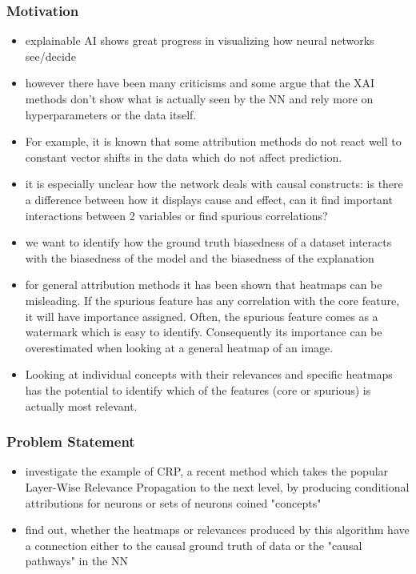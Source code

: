 \subsubsection*{Motivation}
\begin{itemize}
    \item explainable AI shows great progress in visualizing how neural networks see/decide
    \item however there have been many criticisms and some argue that the XAI methods don't show what is actually seen by the NN and rely more on hyperparameters or the data itself.
    \item For example, it is known that some attribution methods do not react well to constant vector shifts in the data which do not affect prediction.
    \item it is especially unclear how the network deals with causal constructs: is there a difference between how it displays cause and effect, can it find important interactions between 2 variables or find spurious correlations?
    \item we want to identify how the ground truth biasedness of a dataset interacts with the biasedness of the model and the biasedness of the explanation
    \item for general attribution methods it has been shown that heatmaps can be misleading. If the spurious feature has any correlation with the core feature, it will have importance assigned. Often, the spurious feature comes as a watermark which is easy to identify. Consequently its importance can be overestimated when looking at a general heatmap of an image.
    \item Looking at individual concepts with their relevances and specific heatmaps has the potential to identify which of the features (core or spurious) is actually most relevant.
\end{itemize}

\subsubsection*{Problem Statement}
\begin{itemize}
    \item investigate the example of CRP, a recent method which takes the popular Layer-Wise Relevance Propagation to the next level, by producing conditional attributions for neurons or sets of neurons coined "concepts"
    \item find out, whether the heatmaps or relevances produced by this algorithm have a connection either to the causal ground truth of data or the "causal pathways" in the NN
\end{itemize}

